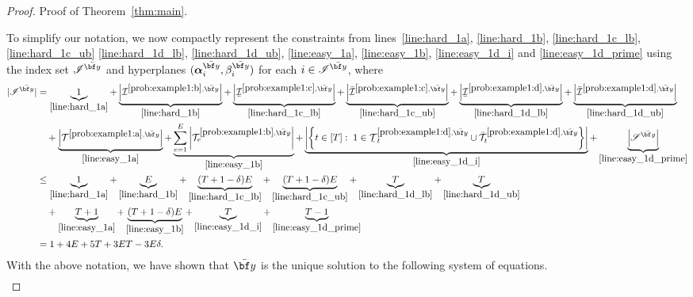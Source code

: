 \documentclass[nonblindrev,mnsc]{informs3} %
\newcommand{\by}{{\bf y}}
\newcommand{\balpha}{{\boldsymbol{\alpha}}}
\newcommand{\ubar}[1]{\text{\b{$#1$}}}
\begin{document}
\begin{APPENDICES}
\begin{proof}{Proof of Theorem~\ref{thm:main}. }
 
To simplify our notation, we now compactly represent the constraints from lines~\eqref{line:hard_1a}, \eqref{line:hard_1b}, \eqref{line:hard_1c_lb}, \eqref{line:hard_1c_ub} \eqref{line:hard_1d_lb}, \eqref{line:hard_1d_ub}, \eqref{line:easy_1a}, \eqref{line:easy_1b}, \eqref{line:easy_1d_i} and \eqref{line:easy_1d_prime} using the index set $\mathscr{I}^{\bar{\by}}$ and hyperplanes $(\balpha_i^{\bar{\by}}, \beta_i^{\bar{\by}})$ for each $i \in \mathscr{I}^{\bar{\by}}$, where 
 \begin{align*}
| \mathscr{I}^{\bar{\by}}|&= \underbrace{1}_{\eqref{line:hard_1a}} +  \underbrace{\left|\mathcal{I}^{\ref{prob:example1:b},\bar{\by}}\right|}_{\eqref{line:hard_1b}} + \underbrace{\left| \ubar{\mathcal{I}}^{\ref{prob:example1:c},\bar{\by}}   \right| }_{\eqref{line:hard_1c_lb}} + \underbrace{\left| \bar{\mathcal{I}}^{\ref{prob:example1:c},\bar{\by}}   \right| }_{\eqref{line:hard_1c_ub}} +  \underbrace{\left| \ubar{\mathcal{I}}^{\ref{prob:example1:d},\bar{\by}} \right|}_{\eqref{line:hard_1d_lb}}+  \underbrace{\left| \bar{\mathcal{I}}^{\ref{prob:example1:d},\bar{\by}} \right|}_{\eqref{line:hard_1d_ub}} \\
&\quad +\underbrace{\left|  \mathcal{T}^{\ref{prob:example1:a},\bar{\by}} \right| }_{\eqref{line:easy_1a}} + \underbrace{ \sum_{e=1}^E \left| \mathcal{T}^{\ref{prob:example1:b},\bar{\by}}_e \right|}_{\eqref{line:easy_1b}} +  \underbrace{\left| \left \{t \in [T]: \; 1 \in \ubar{\mathcal{T}}^{\ref{prob:example1:d},\bar{\by}}_t \cup \bar{\mathcal{T}}^{\ref{prob:example1:d},\bar{\by}}_t \right \} \right| }_{\eqref{line:easy_1d_i}}+ \underbrace{ \left| \mathscr{S}^{\bar{\by}} \right|}_{\eqref{line:easy_1d_prime}}\\
&\le \underbrace{1}_{\eqref{line:hard_1a}} +  \underbrace{E}_{\eqref{line:hard_1b}} + \underbrace{(T+1-\delta)E}_{\eqref{line:hard_1c_lb}}  + \underbrace{(T+1-\delta)E}_{\eqref{line:hard_1c_ub}} + \underbrace{T}_{\eqref{line:hard_1d_lb}}+ \underbrace{T}_{\eqref{line:hard_1d_ub}}\\
&\quad + \underbrace{T+1}_{\eqref{line:easy_1a}} + \underbrace{(T+1-\delta)E }_{\eqref{line:easy_1b}} +  \underbrace{T }_{\eqref{line:easy_1d_i}} + \underbrace{T-1}_{\eqref{line:easy_1d_prime}}  \\
&= 1 + 4E + 5T + 3ET -3E\delta.
 \end{align*}
With the above notation, we have shown that $\bar{\by}$ is the unique solution to the following system of equations.
\begin{align}

\end{align}
\end{proof}
\end{APPENDICES}
\end{document}

